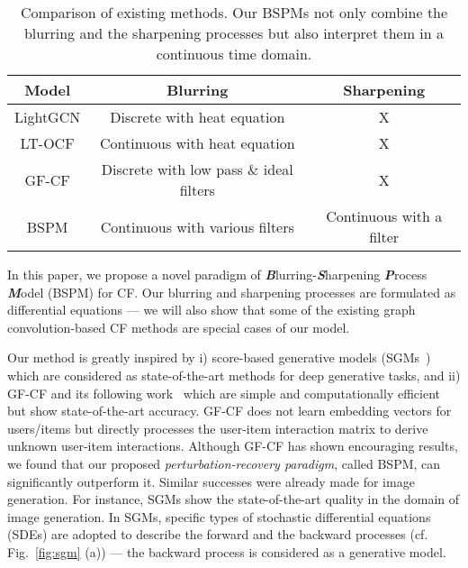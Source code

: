 \documentclass[sigconf,natbib=true]{acmart}
\begin{document}
\begin{table}[t]
    \small
    \setlength\tabcolsep{2pt}
    \caption{Comparison of existing methods. Our BSPMs not only combine the blurring and the sharpening processes but also interpret them in a continuous time domain.}\label{tbl:cmp1}
    \begin{tabular}{ccc}
    \toprule
    Model & Blurring & Sharpening \\ \midrule
    LightGCN & Discrete with heat equation & X \\ 
    LT-OCF & Continuous with heat equation & X \\ 
    GF-CF & Discrete with low pass \& ideal filters & X \\  \midrule
    BSPM & Continuous with various filters & Continuous with a filter \\ \bottomrule
    \end{tabular}
\end{table}

In this paper, we propose a novel paradigm of \textit{\textbf{B}}lurring-\textit{\textbf{S}}harpening \textit{\textbf{P}}rocess \textit{\textbf{M}}odel (BSPM) for CF. Our blurring and sharpening processes are formulated as differential equations --- we will also show that some of the existing graph convolution-based CF methods are special cases of our model.

Our method is greatly inspired by i) score-based generative models (SGMs~\cite{song2021scorebased,song2021maximum,song2020improved}) which are considered as state-of-the-art methods for deep generative tasks, and ii) GF-CF and its following work~\cite{Shen21GFCF,Peng2022Less,Peng2022SVDGCN,hu2022mgdcf,Xia2022FIRE,liu2022parameterfree} which are simple and computationally efficient but show state-of-the-art accuracy. GF-CF does not learn embedding vectors for users/items but directly processes the user-item interaction matrix to derive unknown user-item interactions. Although GF-CF has shown encouraging results, we found that our proposed \emph{perturbation-recovery paradigm}, called BSPM, can significantly outperform it. Similar successes were already made for image generation. For instance, SGMs show the state-of-the-art quality in the domain of image generation. In SGMs, specific types of stochastic differential equations (SDEs) are adopted to describe the forward and the backward processes (cf. Fig.~\ref{fig:sgm} (a)) --- the backward process is considered as a generative model.
\end{document}
